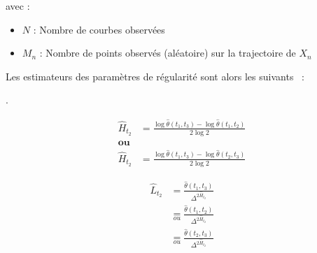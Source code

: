 avec :

\begin{itemize}
	\item $N$ : Nombre de courbes observées
	\item $M_n$ : Nombre de points observés (aléatoire) sur la trajectoire de $X_n$
\end{itemize}

Les estimateurs des paramètres de régularité sont alors les suivants ~\cite{maissoro-SmoothnessFTSweakDep}:

\begin{definition}
	.

	\begin{minipage}{0.5\textwidth}
		\begin{align*}
			\hat H_{t_2} & = \frac{ \log \hat \theta(t_1, t_3) - \log \hat \theta(t_1, t_2) }{2 \log 2}
			\\
			\textbf{ou}
			\\
			\hat H_{t_2} & = \frac{ \log \hat \theta(t_1, t_3) - \log \hat \theta(t_2, t_3) }{2 \log 2}
		\end{align*}
	\end{minipage}
	\begin{minipage}{0.5\textwidth}
		\begin{align*}
			\widehat L_{t_2} & = \frac{\widehat \theta(t_1, t_3)}{\Delta^{2 \widehat H_{t_2}}}
			\\ &\underset{ou}= \frac{\widehat \theta(t_1, t_2)}{\Delta^{2 \widehat H_{t_2}}}
			\\ &\underset{ou}= \frac{\widehat \theta(t_2, t_3)}{\Delta^{2 \widehat H_{t_2}}}
		\end{align*}
	\end{minipage}
\end{definition}

